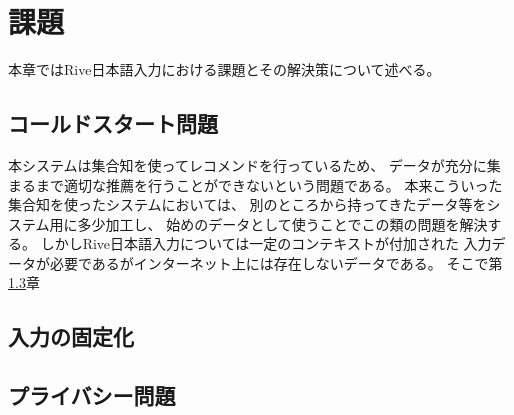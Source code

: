 \chapter{課題}
\label{chap:discussion}
本章ではRive日本語入力における課題とその解決策について述べる。

\newpage
\section{コールドスタート問題}
本システムは集合知を使ってレコメンドを行っているため、
データが充分に集まるまで適切な推薦を行うことができないという問題である。
本来こういった集合知を使ったシステムにおいては、
別のところから持ってきたデータ等をシステム用に多少加工し、
始めのデータとして使うことでこの類の問題を解決する。
しかしRive日本語入力については一定のコンテキストが付加された
入力データが必要であるがインターネット上には存在しないデータである。
そこで第\ref{}章

\section{入力の固定化}

\section{プライバシー問題}

